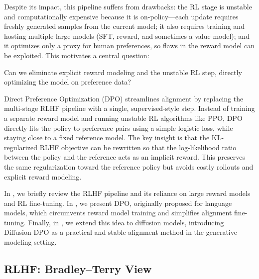 Despite its impact, this pipeline suffers from drawbacks: the RL stage is unstable and computationally expensive because it is on-policy—each update requires freshly generated samples from the current model; it also requires training and hosting multiple large models (SFT, reward, and sometimes a value model); and it optimizes only a proxy for human preferences, so flaws in the reward model can be exploited. This motivates a central question:
\begin{question}
    Can we eliminate explicit reward modeling and the unstable RL step, directly optimizing the model on preference data?
\end{question}

Direct Preference Optimization (DPO) streamlines alignment by replacing the multi-stage RLHF pipeline with a single, supervised-style step. Instead of training a separate reward model and running unstable RL algorithms like PPO, DPO directly fits the policy to preference pairs using a simple logistic loss, while staying close to a fixed reference model. The key insight is that the KL-regularized RLHF objective can be rewritten so that the log-likelihood ratio between the policy and the reference acts as an implicit reward. This preserves the same regularization toward the reference policy but avoids costly rollouts and explicit reward modeling.

In , we briefly review the RLHF pipeline and its reliance on large reward models and RL fine-tuning. In , we present DPO, originally proposed for language models, which circumvents reward model training and simplifies alignment fine-tuning. Finally, in , we extend this idea to diffusion models, introducing Diffusion-DPO as a practical and stable alignment method in the generative modeling setting.

\subsection{RLHF: Bradley--Terry View}\label{subsec:rlhf-bradley-terry}


